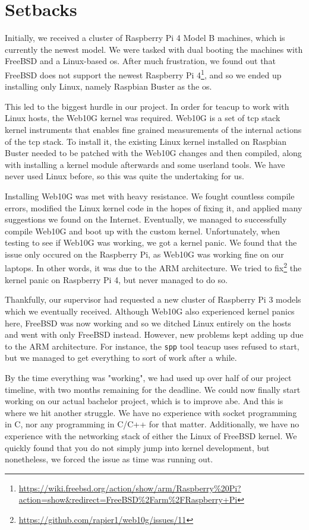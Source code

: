 \section{Setbacks}

Initially, we received a cluster of Raspberry Pi 4 Model B machines, which is currently the newest model. We were tasked with dual booting the machines with FreeBSD and a Linux-based \gls{os}. After much frustration, we found out that FreeBSD does not support the newest Raspberry Pi 4\footnote{\url{https://wiki.freebsd.org/action/show/arm/Raspberry\%20Pi?action=show\&redirect=FreeBSD\%2Farm\%2FRaspberry+Pi}}, and so we ended up installing only Linux, namely Raspbian Buster as the \gls{os}.

This led to the biggest hurdle in our project. In order for \gls{teacup} to work with Linux hosts, the Web10G kernel was required. Web10G is a set of \gls{tcp} stack kernel instruments that enables fine grained measurements of the internal actions of the \gls{tcp} stack. To install it, the existing Linux kernel installed on Raspbian Buster needed to be patched with the Web10G changes and then compiled, along with installing a kernel module afterwards and some userland tools. We have never used Linux before, so this was quite the undertaking for us.

Installing Web10G was met with heavy resistance. We fought countless compile errors, modified the Linux kernel code in the hopes of fixing it, and applied many suggestions we found on the Internet. Eventually, we managed to successfully compile Web10G and boot up with the custom kernel. Unfortunately, when testing to see if Web10G was working, we got a kernel panic. We found that the issue only occured on the Raspberry Pi, as Web10G was working fine on our laptops. In other words, it was due to the ARM architecture. We tried to fix\footnote{\url{https://github.com/rapier1/web10g/issues/11}} the kernel panic on Raspberry Pi 4, but never managed to do so.

Thankfully, our supervisor had requested a new cluster of Raspberry Pi 3 models which we eventually received. Although Web10G also experienced kernel panics here, FreeBSD was now working and so we ditched Linux entirely on the hosts and went with only FreeBSD instead. However, new problems kept adding up due to the ARM architecture. For instance, the \lstinline{spp} tool \gls{teacup} uses refused to start, but we managed to get everything to sort of work after a while.

By the time everything was "working", we had used up over half of our project timeline, with two months remaining for the deadline. We could now finally start working on our actual bachelor project, which is to improve \gls{abe}. And this is where we hit another struggle. We have no experience with socket programming in C, nor any programming in C/C++ for that matter. Additionally, we have no experience with the networking stack of either the Linux of FreeBSD kernel. We quickly found that you do not simply jump into kernel development, but nonetheless, we forced the issue as time was running out.

